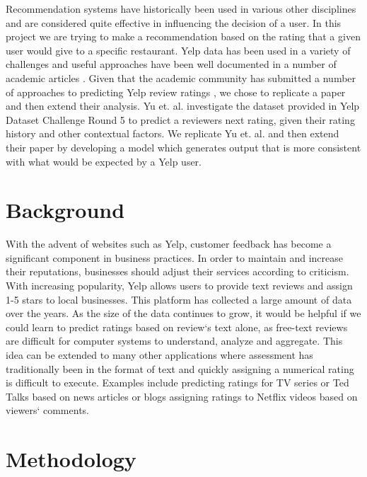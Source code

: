 \documentclass[12pt]{article}
\begin{document}
Recommendation systems have historically been used in various other disciplines and
are considered quite effective in influencing the decision of a user. In this project
we are trying to make a recommendation based on the rating that a given user would give
to a specific restaurant. Yelp data \cite{YelpData60:online, YelpData59:online} has been
used in a variety of challenges and useful approaches have been well documented in a number of
academic articles \cite{yu2015restaurants, huang2014improving, fan2014predicting,asghar2016yelp}.
Given that the academic community has submitted a number of approaches to predicting
Yelp review ratings \cite{asghar2016yelp, potamias2012warm, fan2014predicting, yu2015restaurants},
we chose to replicate a paper and then extend their analysis. Yu et. al. \cite{yu2015restaurants}
investigate the dataset provided in Yelp Dataset Challenge Round 5 to predict a reviewers
next rating, given their rating history and other contextual factors. We replicate
Yu et. al. \cite{yu2015restaurants} and then extend their paper by developing a model which
generates output that is more consistent with what would be expected by a Yelp user.


\section{Background}
With the advent of websites such as Yelp, customer feedback has become a significant component in business practices. 
In order to maintain and increase their reputations, businesses should adjust their services according to criticism. 
With increasing popularity, Yelp allows users to provide text reviews and assign 1-5 stars to local businesses. 
This platform has collected a large amount of data over the years. As the size of the data continues to grow, 
it would be helpful if we could learn to predict ratings based on review‘s text alone, as free-text reviews are difficult 
for computer systems to understand, analyze and aggregate. This idea can be extended to many other applications where assessment 
has traditionally been in the format of text and quickly assigning a numerical rating is difficult to execute. Examples include 
predicting ratings for TV series or Ted Talks based on news articles or blogs assigning ratings to Netflix videos based on viewers‘ comments.

\section{Methodology}
\end{document}
